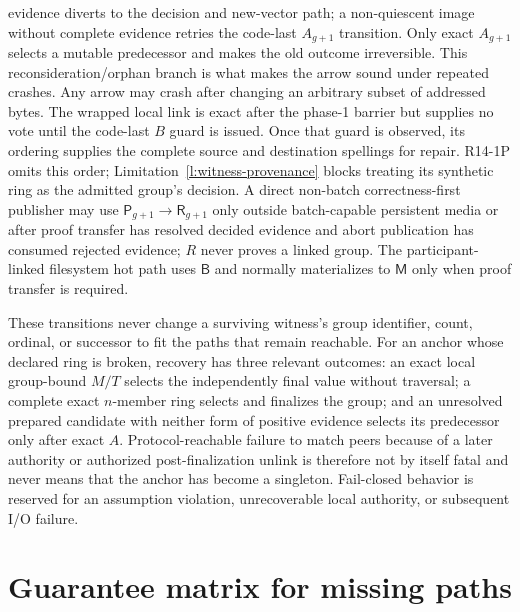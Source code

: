 \documentclass[10pt,twocolumn]{article}
\theoremstyle{remark}
\newcommand{\Root}{\mathsf{R}}
\newcommand{\Prepared}{\mathsf{B}}
\newcommand{\Materialized}{\mathsf{M}}
\begin{document}
evidence diverts to the decision and new-vector path; a non-quiescent image without complete evidence retries the code-last
$A_{g+1}$ transition. Only exact $A_{g+1}$ selects a mutable predecessor and makes the old outcome
irreversible. This reconsideration/orphan branch is what makes the arrow sound under repeated crashes.
Any arrow may crash after changing an arbitrary subset of addressed bytes. The wrapped local link
is exact after the phase-1 barrier but supplies no vote until the code-last $B$ guard is issued.
Once that guard is observed, its ordering supplies the complete source and destination spellings
for repair. R14-1P omits this order; Limitation~\ref{l:witness-provenance} blocks treating its
synthetic ring as the admitted group's decision.
A direct non-batch correctness-first publisher may use
$\mathsf{P}_{g+1}\to\Root_{g+1}$ only outside batch-capable persistent media or after proof transfer
has resolved decided evidence and abort publication has consumed rejected evidence; $R$ never proves
a linked group. The
participant-linked filesystem hot path uses $\Prepared$ and normally materializes to
$\Materialized$ only when proof transfer is required.

These transitions never change a surviving witness's group identifier, count, ordinal, or
successor to fit the paths that remain reachable. For an anchor whose declared ring is broken,
recovery has three relevant outcomes: an exact local group-bound $M/T$ selects the independently
final value without traversal; a complete exact $n$-member ring selects and finalizes the group; and
an unresolved prepared candidate with neither form of positive evidence selects its predecessor
only after exact $A$. Protocol-reachable failure to match peers because of a later authority or
authorized post-finalization unlink is therefore not by itself fatal and never means that the anchor
has become a singleton. Fail-closed behavior is reserved for an assumption violation, unrecoverable
local authority, or subsequent I/O failure.

\section{Guarantee matrix for missing paths}
\end{document}
